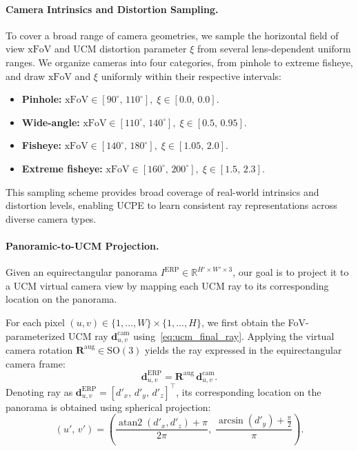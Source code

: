 \paragraph{Camera Intrinsics and Distortion Sampling.}
To cover a broad range of camera geometries, we sample the horizontal field of view \(\mathrm{xFoV}\) and UCM distortion parameter \(\xi\) from several lens-dependent uniform ranges.
We organize cameras into four categories, from pinhole to extreme fisheye, and draw
\(\mathrm{xFoV}\) and \(\xi\) uniformly within their respective intervals:
\begin{itemize}
    \item \textbf{Pinhole:}
    \(\mathrm{xFoV}\!\in[90^\circ,\,110^\circ],\;
    \xi\!\in[0.0,\,0.0]\).
    \item \textbf{Wide-angle:}
    \(\mathrm{xFoV}\!\in[110^\circ,\,140^\circ],\;
    \xi\!\in[0.5,\,0.95]\).
    \item \textbf{Fisheye:}
    \(\mathrm{xFoV}\!\in[140^\circ,\,180^\circ],\;
    \xi\!\in[1.05,\,2.0]\).
    \item \textbf{Extreme fisheye:}
    \(\mathrm{xFoV}\!\in[160^\circ,\,200^\circ],\;
    \xi\!\in[1.5,\,2.3]\).
\end{itemize}
This sampling scheme provides broad coverage of real-world intrinsics and distortion levels, enabling UCPE to learn consistent ray representations across diverse camera types.

\paragraph{Panoramic-to-UCM Projection.}
Given an equirectangular panorama \(I^{\mathrm{ERP}}\in\mathbb{R}^{H' \times W' \times 3}\),
our goal is to project it to a UCM virtual camera view by mapping each UCM ray to its corresponding location on the panorama.

For each pixel \((u,v)\in\{1,\ldots,W\}\times\{1,\ldots,H\}\), we first obtain the FoV-parameterized UCM ray
\(\bm{d}^{\mathrm{cam}}_{u,v}\) using~\cref{eq:ucm_final_ray}.
Applying the virtual camera rotation \(\mathbf{R}^{\mathrm{aug}}\in\mathrm{SO}(3)\) yields the ray expressed in the equirectangular camera frame:
\begin{equation}
\bm{d}^{\mathrm{ERP}}_{u,v}
=
\mathbf{R}^{\mathrm{aug}}\,
\bm{d}^{\mathrm{cam}}_{u,v}.
\label{eq:ucm_ray_world_uv_revised}
\end{equation}
Denoting ray as \(\bm{d}^{\mathrm{ERP}}_{u,v} = [d'_x,\, d'_y,\, d'_z]^\top\), its corresponding location on the panorama is obtained using spherical projection:
\begin{equation}
(u',\, v')
=
\left(
\frac{\operatorname{atan2}(d'_x,d'_z)+\pi}{2\pi},\;
\frac{\arcsin(d'_y)+\tfrac{\pi}{2}}{\pi}
\right).
\label{eq:erp_project_simplified_revised}
\end{equation}


